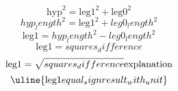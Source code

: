 \[\text{{{hyp}}}^{{2}}=\text{{{leg1}}}^{{2}}+\text{{{leg0}}}^{{2}}\]
\[{hyp_length}^{{2}}=\text{{{leg1}}}^{{2}}+{leg0_length}^{{2}}\]
\[\text{{{leg1}}}={hyp_length}^{{2}}-{leg0_length}^{{2}}\]
\[\text{{{leg1}}}={squares_difference}\]
\[\text{{{leg1}}}=\sqrt{{\mathstrut {squares_difference}}}\text{{{explanation}}}\]
\[\uline{{\text{{{leg1}}}{equal_sign}{result_with_unit}}}\]